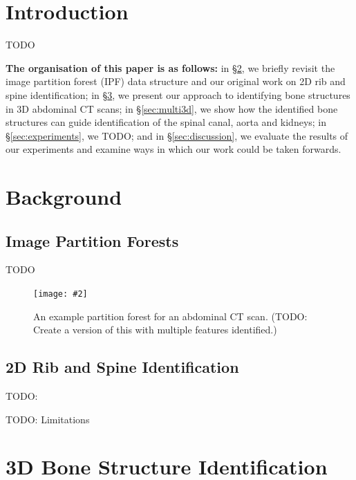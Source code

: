 \documentclass[10pt,twocolumn,twoside]{IEEEtran}
\newcommand{\stufigex}[5]					%
{
	\begin{figure}[#5]
	\begin{center}
		\texttt{[image: \#2]}
		\caption{#3}
		\label{#4}
	\end{center}
	\end{figure}
}
\begin{document}
\IEEEpeerreviewmaketitle

\section{Introduction}

TODO

\textbf{The organisation of this paper is as follows:} in \S\ref{sec:background}, we briefly revisit the image partition forest (IPF) data structure and our original work on 2D rib and spine identification; in \S\ref{sec:bone3d}, we present our approach to identifying bone structures in 3D abdominal CT scans; in \S\ref{sec:multi3d}, we show how the identified bone structures can guide identification of the spinal canal, aorta and kidneys; in \S\ref{sec:experiments}, we TODO; and in \S\ref{sec:discussion}, we evaluate the results of our experiments and examine ways in which our work could be taken forwards.

\section{Background}
\label{sec:background}

\subsection{Image Partition Forests}

TODO

\stufigex{width=.85\linewidth}{ipfs-ctconcept.png}{An example partition forest for an abdominal CT scan. (TODO: Create a version of this with multiple features identified.)}{fig:ipfs-ctconcept}{htb}

\subsection{2D Rib and Spine Identification}

TODO: \cite{gvccimi08,gvcispa09}

TODO: Limitations

\section{3D Bone Structure Identification}
\label{sec:bone3d}

\IEEEpubidadjcol
\end{document}
